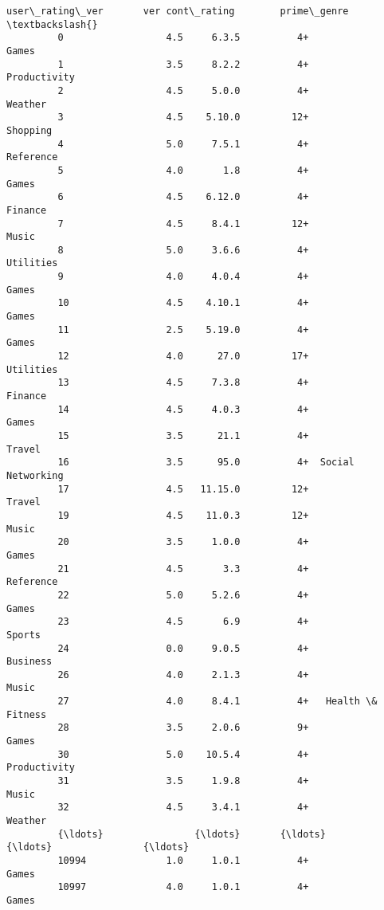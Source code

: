 \documentclass[11pt]{article}
\begin{document}
\begin{Verbatim}[commandchars=\\\{\}]
                user\_rating\_ver       ver cont\_rating        prime\_genre  \textbackslash{}
         0                  4.5     6.3.5          4+              Games   
         1                  3.5     8.2.2          4+       Productivity   
         2                  4.5     5.0.0          4+            Weather   
         3                  4.5    5.10.0         12+           Shopping   
         4                  5.0     7.5.1          4+          Reference   
         5                  4.0       1.8          4+              Games   
         6                  4.5    6.12.0          4+            Finance   
         7                  4.5     8.4.1         12+              Music   
         8                  5.0     3.6.6          4+          Utilities   
         9                  4.0     4.0.4          4+              Games   
         10                 4.5    4.10.1          4+              Games   
         11                 2.5    5.19.0          4+              Games   
         12                 4.0      27.0         17+          Utilities   
         13                 4.5     7.3.8          4+            Finance   
         14                 4.5     4.0.3          4+              Games   
         15                 3.5      21.1          4+             Travel   
         16                 3.5      95.0          4+  Social Networking   
         17                 4.5   11.15.0         12+             Travel   
         19                 4.5    11.0.3         12+              Music   
         20                 3.5     1.0.0          4+              Games   
         21                 4.5       3.3          4+          Reference   
         22                 5.0     5.2.6          4+              Games   
         23                 4.5       6.9          4+             Sports   
         24                 0.0     9.0.5          4+           Business   
         26                 4.0     2.1.3          4+              Music   
         27                 4.0     8.4.1          4+   Health \& Fitness   
         28                 3.5     2.0.6          9+              Games   
         30                 5.0    10.5.4          4+       Productivity   
         31                 3.5     1.9.8          4+              Music   
         32                 4.5     3.4.1          4+            Weather   
         {\ldots}                {\ldots}       {\ldots}         {\ldots}                {\ldots}   
         10994              1.0     1.0.1          4+              Games   
         10997              4.0     1.0.1          4+              Games   

\end{Verbatim}
\end{document}
